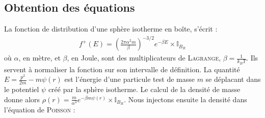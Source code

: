 \subsection{Obtention des équations}
	La fonction de distribution d'une sphère isotherme en boîte, s'écrit :
	\begin{eqnarray}
		f^+(E) = \left(\frac{2\pi\alpha^2m}{\beta}\right)^{-3/2}e^{-\beta E}\times\mathbb{I}_{B_R}
	\end{eqnarray}
	où $\alpha$, en mètre, et $\beta$, en Joule, sont des multiplicateurs de \textsc{Lagrange}, \mbox{$\beta = \frac{1}{k_B T}$}.
	Ils servent à normaliser la fonction sur son intervalle de définition.
	La quantité \mbox{$E = \frac{p^2}{2m} - m\psi(r)$} est l'énergie d'une particule test de masse $m$ se déplacant dans
	le potentiel $\psi$ créé par la sphère isotherme.
	Le calcul de la densité de masse donne alors \mbox{$\rho(r) = \frac{m}{\alpha^3}e^{-\beta m \psi(r)}\times\mathbb{I}_{B_R}$}. %
	Nous injectons ensuite la densité dans l'équation de \textsc{Poisson} :
